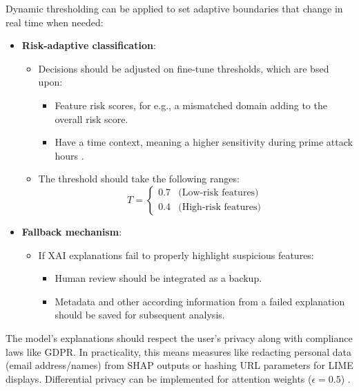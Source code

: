 \noindent Dynamic thresholding can be applied to set adaptive boundaries that change in real time when needed:

\begin{itemize}
  \item \textbf{Risk-adaptive classification}:
  \begin{itemize}
    \item Decisions should be adjusted on fine-tune thresholds, which are bsed upon:
    \begin{itemize}
      \item Feature risk scores, for e.g., a mismatched domain adding to the overall risk score.
      \item Have a time context, meaning a higher sensitivity during prime attack hours \citep{vishwanath2011people}.
    \end{itemize}
    \item The threshold should take the following ranges:
    \begin{equation}
      T = \begin{cases}
        0.7 & \text{(Low-risk features)} \\
        0.4 & \text{(High-risk features)}
      \end{cases}
    \end{equation}
  \end{itemize}
  \item \textbf{Fallback mechanism}:
  \begin{itemize}
    \item If XAI explanations fail to properly highlight suspicious features:
    \begin{itemize}
      \item Human review should be integrated as a backup.
      \item Metadata and other according information from a failed explanation should be saved for subsequent analysis.
    \end{itemize}
  \end{itemize}
\end{itemize}

\noindent The model's explanations should respect the user's privacy along with compliance laws like GDPR. In practicality, this means measures like redacting personal data (email address/names) from SHAP outputs or hashing URL parameters for LIME displays. Differential privacy can be implemented for attention weights ($\epsilon=0.5$) \citep{hanif2021survey}.
